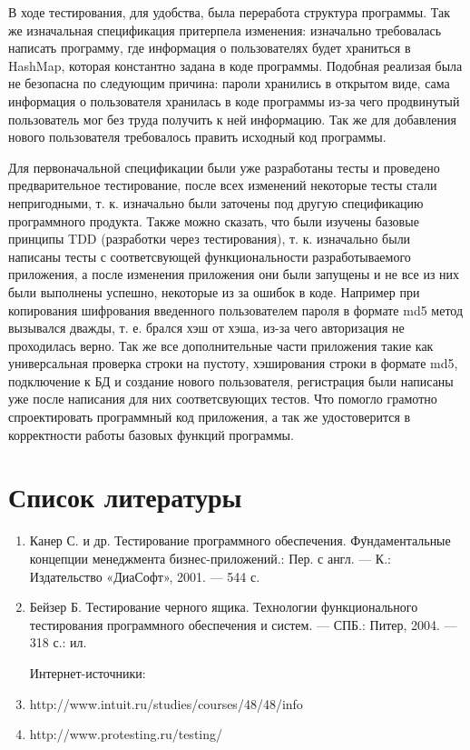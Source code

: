 \documentclass[a4paper,12pt]{article}
\begin{document}
\par В ходе тестирования, для удобства, была переработа структура программы. Так же изначальная спецификация притерпела изменения: изначально требовалась написать программу, где информация о пользователях будет храниться в HashMap, которая константно задана в коде программы. Подобная реализая была не безопасна по следующим причина: пароли хранились в открытом виде, сама информация о пользователя хранилась в коде программы из-за чего продвинутый пользователь мог без труда получить к ней информацию. Так же для добавления нового пользователя требовалось править исходный код программы.
\par Для первоначальной спецификации были уже разработаны тесты и проведено предварительное тестирование, после всех изменений некоторые тесты стали непригодными, т. к. изначально были заточены под другую спецификацию программного продукта. Также можно сказать, что были изучены базовые принципы TDD (разработки через тестирования), т. к. изначально были написаны тесты с соответсвующей функциональности разработываемого приложения, а после изменения приложения они были запущены и не все из них были выполнены успешно, некоторые из за ошибок в коде. Например при копирования шифрования введенного пользователем пароля в формате md5 метод вызывался дважды, т. е. брался хэш от хэша, из-за чего авторизация не проходилась верно. Так же все дополнительные части приложения такие как универсальная проверка строки на пустоту, хэширования строки в формате md5, подключение к БД и создание нового пользователя, регистрация были написаны уже после написания для них соответсвующих тестов. Что помогло грамотно спроектировать программный код приложения, а так же удостоверится в корректности работы базовых функций программы.

\newpage\section*{Список литературы}

\begin{enumerate}
\item Канер С.  и др. Тестирование  программного  обеспечения.  Фундаментальные  концепции  
менеджмента бизнес-приложений.:  Пер.  с англ.  —  К.:  Издательство  «ДиаСофт»,  2001.  —  544  с.  
\item Бейзер Б. Тестирование черного ящика. Технологии функционального тестирования программного обеспечения и систем.  —  СПБ.: Питер, 2004.  —  318 с.: ил.
\par Интернет-источники:
\item http://www.intuit.ru/studies/courses/48/48/info
\item http://www.protesting.ru/testing/
\end{enumerate}
\end{document}
